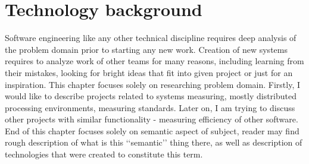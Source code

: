 %

\chapter{Technology background}
\label{cha:background}

\parbox{0.8\textwidth}{

{\small
Software engineering like any other technical discipline requires deep analysis of the problem domain prior to starting any new work. Creation of new systems requires to analyze work of other teams for many reasons, including learning from their mistakes, looking for bright ideas that fit into given project or just for an inspiration. This chapter focuses solely on researching problem domain. Firstly, I would like to describe projects related to systems measuring, mostly distributed processing environments, measuring standards. Later on, I am trying to discuss other projects with similar functionality - measuring efficiency of other software. End of this chapter focuses solely on semantic aspect of subject, reader may find rough description of what is this \lq\lq{}semantic\rq\rq{} thing there, as well as description of technologies that were created to constitute this term.

}
}




